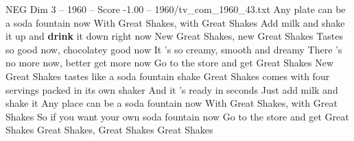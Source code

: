 \begin{textsample}{NEG Dim 3 – 1960 – Score -1.00 – 1960/tv\_com\_1960\_43.txt}  \label{ex:f3_neg_079}
Any plate can be a soda fountain now With Great Shakes, with Great Shakes Add milk and shake it up and \textbf{drink} it down right now New Great Shakes, new Great Shakes Tastes so good now, chocolatey good now It 's so creamy, smooth and dreamy There 's no more now, better get more now Go to the store and get Great Shakes New Great Shakes tastes like a soda fountain shake Great Shakes comes with four servings packed in its own shaker And it 's ready in seconds Just add milk and shake it Any place can be a soda fountain now With Great Shakes, with Great Shakes So if you want your own soda fountain now Go to the store and get Great Shakes Great Shakes, Great Shakes Great Shakes

\end{textsample}
